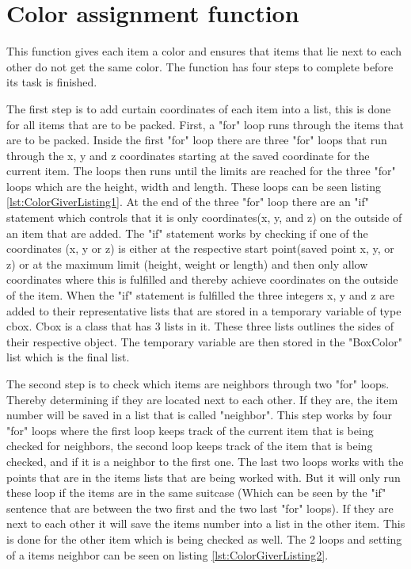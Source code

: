 \section{Color assignment function}
\label{sec:ColorGiver}
This function gives each item a color and ensures that items that lie next to each other do not get the same color. The function has four steps to complete before its task is finished.

The first step is to add curtain coordinates of each item into a list, this is done for all items that are to be packed. First, a "for" loop runs through the items that are to be packed. Inside the first "for" loop there are three "for" loops that run through the x, y and z coordinates starting at the saved coordinate for the current item. The loops then runs until the limits are reached for the three "for" loops which are the height, width and length. These loops can be seen listing \ref{lst:ColorGiverListing1}. At the end of the three "for" loop there are an "if" statement which controls that it is only coordinates(x, y, and z) on the outside of an item that are added. The "if" statement works by checking if one of the coordinates (x, y or z) is either at the respective start point(saved point x, y, or z) or at the maximum limit (height, weight or length) and then only allow coordinates where this is fulfilled and thereby achieve coordinates on the outside of the item.
When the "if" statement is fulfilled the three integers x, y and z are added to their representative lists that are stored in a temporary variable of type cbox. Cbox is a class that has 3 lists in it. These three lists outlines the sides of their respective object. The temporary variable are then stored in the "BoxColor" list which is the final list.

The second step is to check which items are neighbors through two "for" loops. Thereby determining if they are located next to each other. If they are, the item number will be saved in a list that is called "neighbor". This step works by four "for" loops where the first loop keeps track of the current item that is being checked for neighbors, the second loop keeps track of the item that is being checked, and if it is a neighbor to the first one. The last two loops works with the points that are in the items lists that are being worked with. But it will only run these loop if the items are in the same suitcase (Which can be seen by the "if" sentence that are between the two first and the two last "for" loops). If they are next to each other it will save the items number into a list in the other item. This is done for the other item which is being checked as well. The 2 loops and setting of a items neighbor can be seen on listing \ref{lst:ColorGiverListing2}.

